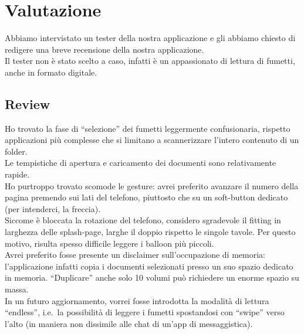 \documentclass[../Assignment-3-LPSMT.tex]{subfiles}
\begin{document}
\chapter{Valutazione}

Abbiamo intervistato un tester della nostra applicazione e gli abbiamo chiesto di redigere una breve recensione della nostra applicazione.\\
Il tester non è stato scelto a caso, infatti è un appassionato di lettura di fumetti, anche in formato digitale.

\section{Review}

Ho trovato la fase di ``selezione'' dei fumetti leggermente confusionaria, rispetto applicazioni più complesse che si limitano a scannerizzare l'intero contenuto di un folder.\\
Le tempistiche di apertura e caricamento dei documenti sono relativamente rapide.\\
Ho purtroppo trovato scomode le gesture: avrei preferito avanzare il numero della pagina premendo sui lati del telefono, piuttosto che su un soft-button dedicato (per intenderci, la freccia).\\
Siccome è bloccata la rotazione del telefono, considero sgradevole il fitting in larghezza delle splash-page, larghe il doppio rispetto le singole tavole. Per questo motivo, risulta spesso difficile leggere i balloon più piccoli.\\
Avrei preferito fosse presente un disclaimer sull'occupazione di memoria: l'applicazione infatti copia i documenti selezionati presso un suo spazio dedicato in memoria. ``Duplicare'' anche solo 10 volumi può richiedere un enorme spazio su massa.\\
In un futuro aggiornamento, vorrei fosse introdotta la modalità di lettura ``endless'', i.e.\ la possibilità di leggere i fumetti spostandosi con ``swipe'' verso l'alto (in maniera non dissimile alle chat di un'app di messaggistica).
\end{document}
